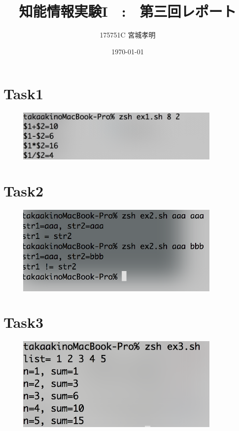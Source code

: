 \documentclass[a4paper,11pt,titlepage]{jarticle}
\title{知能情報実験I　:　第三回レポート}
\author{175751C 宮城孝明}
\date{\today}
\begin{document}
\maketitle
\tableofcontents
\clearpage

\section{Task1}
\begin{figure}[htbp]
	\centering
	\includegraphics[width=100mm]{task3_1.png}
	\label{task3_1}\\
\end{figure}

\section{Task2}
\begin{figure}[htbp]
	\centering
	\includegraphics[width=100mm]{task3_2.png}
	\label{task3_2}\\
\end{figure}

\section{Task3}
\begin{figure}[htbp]
	\centering
	\includegraphics[width=100mm]{task3_3.png}
	\label{task3_3}\\
\end{figure}
\end{document}

